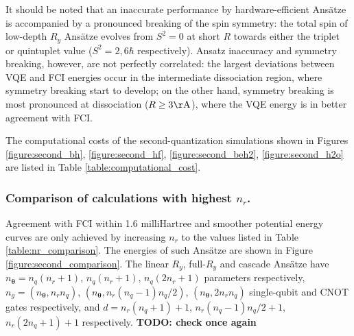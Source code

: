 \documentclass[aps,pra,onecolumn]{revtex4-2}
\newcommand{\bgreek}[1]{{\boldsymbol{#1}}}
\newcommand{\ry}{R_y}
\newcommand{\ang}{\mathrm{\AA}}
\newcommand{\todo}[1]{{\bf{{\color{red}TODO: #1}}}}
\begin{document}
It should be noted that an inaccurate performance by hardware-efficient Ans\"{a}tze is accompanied by a pronounced breaking of the spin symmetry:
the total spin of low-depth $\ry$ Ans\"{a}tze evolves from $S^2 = 0$ at short $R$ towards either the triplet or quintuplet value ($S^2 = 2,6 \hbar$ respectively).
Ansatz inaccuracy and symmetry breaking, however, are not perfectly correlated: the largest deviations between VQE and FCI energies occur in the intermediate dissociation region,
where symmetry breaking start to develop; on the other hand, symmetry breaking is most pronounced at dissociation ($R \geq 3 \ang$),
where the VQE energy is in better agreement with FCI.

The computational costs of the second-quantization simulations shown in Figures \ref{figure:second_bh}, \ref{figure:second_hf}, \ref{figure:second_beh2}, \ref{figure:second_h2o} 
are listed in Table  \ref{table:computational_cost}.
 
\subsubsection{Comparison of calculations with highest $n_r$.}

Agreement with FCI within 1.6 milliHartree and smoother potential energy curves are only achieved by increasing $n_r$ to the values listed in Table \ref{table:nr_comparison}.
The energies of such Ans\"{a}tze are shown in Figure \ref{figure:second_comparison}.
The linear $\ry$, full-$\ry$ and cascade Ans\"{a}tze have $n_{\bgreek{\theta}} = n_q (n_r+1)$, $n_q (n_r+1)$, $n_q (2n_r+1)$ parameters respectively,
$n_g=(n_{\bgreek{\theta}},n_r n_q)$, $(n_{\bgreek{\theta}},n_r (n_q-1) n_q/2)$, $(n_{\bgreek{\theta}},2 n_r n_q)$ single-qubit and CNOT gates respectively,
and $d = n_r (n_q+1) +1$, $n_r (n_q-1) n_q/2 +1$, $n_r (2n_q+1) +1$ respectively. \todo{check once again}
\end{document}
